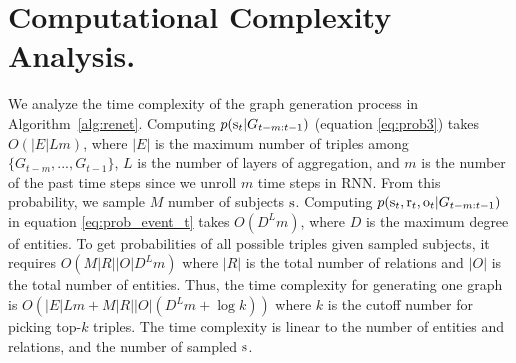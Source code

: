 \section{Computational Complexity Analysis.}
\label{sec:complexity}
We analyze the time complexity of the graph generation process in Algorithm~\ref{alg:renet}. Computing $p(\mathrm{s}_{t}|\allowbreak G_{t-m:t-1})$ (equation \eqref{eq:prob3}) takes $O(|E|Lm)$, where $|E|$ is the maximum number of triples among $\{G_{t-m},...,G_{t-1}\}$, $L$ is the number of layers of aggregation, and $m$ is the number of the past time steps since we unroll $m$ time steps in RNN. From this probability, we sample $M$ number of subjects $\mathrm{s}$. Computing $p(\mathrm{s}_t,\mathrm{r}_t,\mathrm{o}_t|G_{t-m:t-1})$ in equation \eqref{eq:prob_event_t} takes $O(D^L m)$, where $D$ is the maximum degree of entities. To get probabilities of all possible triples given sampled subjects, it requires $O(M|R||O|D^Lm)$ where $|R|$ is the total number of relations and $|O|$ is the total number of entities. Thus, the time complexity for generating one graph is $O(|E|Lm+M|R||O|(D^L m + \log k))$ where $k$ is the cutoff number for picking top-$k$ triples. The time complexity is linear to the number of entities and relations, and the number of sampled $\mathrm{s}$.

\begin{table}[t]
    \centering
    \caption{\textbf{Dataset Statistics.}}
    \label{tab:dataset}
\end{table}


